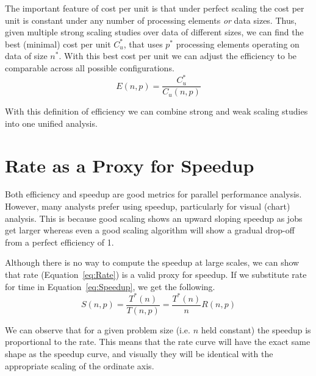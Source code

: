 \documentclass{llncs}
\begin{document}
The important feature of cost per unit is that under perfect scaling the
cost per unit is constant under any number of processing elements \emph{or}
data sizes. Thus, given multiple strong scaling studies over data of
different sizes, we can find the best (minimal) cost per unit $C_u^*$,
that uses $p^*$ processing elements operating on data of size $n^*$.
With this best
cost per unit we can adjust the efficiency to be comparable across all
possible configurations.
\begin{equation}
  E(n,p) = \frac{C_u^*}{C_u(n,p)}
  \label{eq:EfficiencyCostPerUnit}
\end{equation}

With this definition of efficiency we can combine strong and weak scaling
studies into one unified analysis.

\section{Rate as a Proxy for Speedup}
\label{sec:RateProxy}

\noindent
Both efficiency and speedup are good metrics for parallel performance
analysis. However, many analysts prefer using speedup, particularly for
visual (chart) analysis. This is because good scaling shows an upward
sloping speedup as jobs get larger whereas even a good scaling algorithm
will show a gradual drop-off from a perfect efficiency of 1.

Although there is no way to compute the speedup at large scales, we can
show that rate (Equation~\ref{eq:Rate}) is a valid proxy for speedup. If we
substitute rate for time in Equation~\ref{eq:Speedup}, we get the
following.
\begin{equation}
  S(n,p) = \frac{T^*(n)}{T(n,p)} = \frac{T^*(n)}{n} R(n,p)
  \label{eq:SpeedupFromRate}
\end{equation}

We can observe that for a given problem size (i.e. $n$ held constant) the
speedup is proportional to the rate. This means that the rate curve will
have the exact same shape as the speedup curve, and visually they will be
identical with the appropriate scaling of the ordinate axis.
\end{document}

